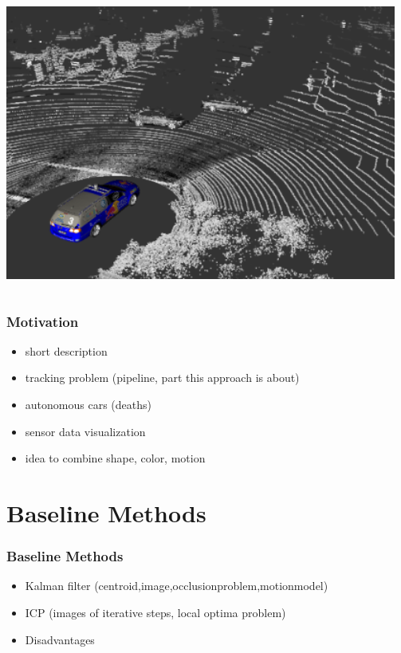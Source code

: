 \begin{frame}
\begin{columns}
\begin{column}{0.4\textwidth}
\bigskip
  \includegraphics[width=\textwidth]{../img/lidar-data}
  \end{column}
  \end{columns}
\end{frame}

\begin{frame}
  \frametitle{Motivation}
  \begin{itemize}
  \item short description
  \item tracking problem (pipeline, part this approach is about)
  \item autonomous cars (deaths)
  \item sensor data visualization
  \item idea to combine shape, color, motion
  \end{itemize}
\end{frame}

\section{Baseline Methods}
\begin{frame}
  \frametitle{Baseline Methods}
  \begin{itemize}
  \item Kalman filter (centroid,image,occlusionproblem,motionmodel)
  \item ICP (images of iterative steps, local optima problem)
  \item Disadvantages
  \end{itemize}
\end{frame}


